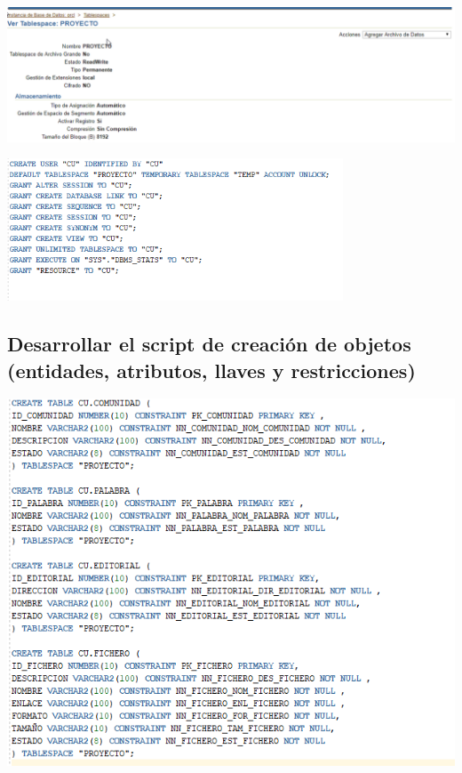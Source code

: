 \documentclass[12pt,letterpaper]{article}
\begin{document}
\begin{center}
	\includegraphics[width=15cm]{./Imagenes/2} 
\end{center}


\begin{center}
	\includegraphics[width=10cm]{./Imagenes/3} 
\end{center}


\subsection{Desarrollar el script de creación de objetos (entidades, atributos, llaves y
restricciones)} 



\begin{center}
	\includegraphics[width=15cm]{./Imagenes/4} 
\end{center}
\end{document}
